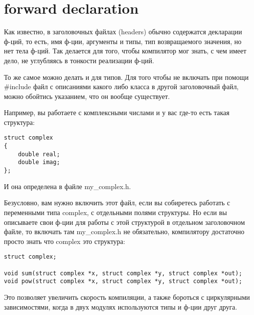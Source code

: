 ﻿\section{forward declaration}

Как известно, в заголовочных файлах (headers) обычно содержатся декларации ф-ций, то есть, 
имя ф-ции, аргументы и типы, тип возвращаемого значения, но нет тела ф-ций. Так делается для того,
чтобы компилятор мог знать, с чем имеет дело, не углубляясь в тонкости реализации ф-ций.

То же самое можно делать и для типов. Для того чтобы не включать при помощи \#include файл с описаниями
какого либо класса в другой заголовочный файл, можно обойтись указанием, что он вообще существует.

Например, вы работаете с комплексными числами и у вас где-то есть такая структура:

\begin{lstlisting}
struct complex
{
	double real;
	double imag;
};
\end{lstlisting}

И она определена в файле my\_complex.h.

Безусловно, вам нужно включить этот файл, если вы собиретесь работать с переменными типа complex, 
с отдельными полями структуры.
Но если вы описываете свои ф-ции для работы с этой структурой в отдельном заголовочном файле, то включать там
my\_complex.h не обязательно, компилятору достаточно просто знать что complex это структура:

\begin{lstlisting}
struct complex;

void sum(struct complex *x, struct complex *y, struct complex *out);
void pow(struct complex *x, struct complex *y, struct complex *out);
\end{lstlisting}

Это позволяет увеличить скорость компиляции, а также бороться с циркулярными зависимостями, когда
в двух модулях используются типы и ф-ции друг друга.
